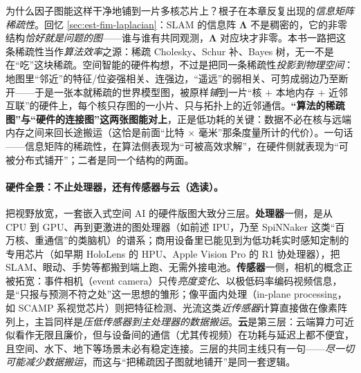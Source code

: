 \begin{insight}[一个对偶：世界模型图 $=$ 信息矩阵稀疏性的硬件投影（选读）]
为什么因子图能这样干净地铺到一片多核芯片上？根子在本章反复出现的\emph{信息矩阵稀疏性}。回忆 \cref{sec:est-fim-laplacian}：SLAM 的信息阵 $\boldsymbol\Lambda$ 不是稠密的，它的非零结构\emph{恰好就是问题的图}——谁与谁有共同观测，$\boldsymbol\Lambda$ 对应块才非零。本书一路把这条稀疏性当作\emph{算法效率}之源：稀疏 Cholesky、Schur 补、Bayes 树，无一不是在“吃”这块稀疏。空间智能的硬件构想，不过是把同一条稀疏性\emph{投影到物理空间}\cite{davison2026computational}：地图里“邻近”的特征/位姿强相关、连强边，“遥远”的弱相关、可剪成弱边乃至断开——于是一张本就稀疏的世界模型图，被原样\emph{铺}到一片“核 $+$ 本地内存 $+$ 近邻互联”的硬件上，每个核只存图的一小片、只与拓扑上的近邻通信。\textbf{“算法的稀疏图”与“硬件的连接图”这两张图能对上}，正是低功耗的关键：数据不必在核与远端内存之间来回长途搬运（这恰是前面“比特 $\times$ 毫米”那条度量所计的代价）。一句话——信息矩阵的稀疏性，在算法侧表现为“可被高效求解”，在硬件侧就表现为“可被分布式铺开”；二者是同一个结构的两面。
\end{insight}

\paragraph{硬件全景：不止处理器，还有传感器与云（选读）。}
把视野放宽，一套嵌入式空间 AI 的硬件版图大致分三层\cite{davison2026computational}。\textbf{处理器}一侧，是从 CPU 到 GPU、再到更激进的图处理器（如前述 IPU，乃至 SpiNNaker 这类“百万核、重通信”的类脑机）的谱系；商用设备里已能见到为低功耗实时感知定制的专用芯片（如早期 HoloLens 的 HPU、Apple Vision Pro 的 R1 协处理器），把 SLAM、眼动、手势等都搬到端上跑、无需外接电池。\textbf{传感器}一侧，相机的概念正被拓宽：事件相机（event camera）只传\emph{亮度变化}、以极低码率编码视频信息，是“只报与预测不符之处”这一思想的雏形；像平面内处理（in-plane processing，如 SCAMP 系视觉芯片）则把特征检测、光流这类\emph{近传感器}计算直接做在像素阵列上，主旨同样是\emph{压低传感器到主处理器的数据搬运}。\textbf{云}是第三层：云端算力可近似看作无限且廉价，但与设备间的通信（尤其传视频）在功耗与延迟上都不便宜，且空间、水下、地下等场景未必有稳定连接。三层的共同主线只有一句——\emph{尽一切可能减少数据搬运}，而这与“把稀疏因子图就地铺开”是同一套逻辑。

